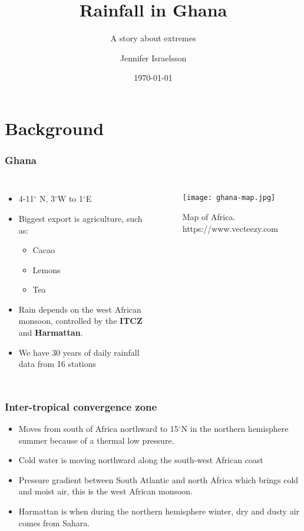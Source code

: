 \documentclass{beamer}
\title{Rainfall in Ghana}
\subtitle{A story about extremes}
\author{Jennifer Israelsson}
\institute{University of Reading}
\date{\today}
\begin{document}
	\begin{frame}
	\titlepage
	\end{frame}

\section{Background}

 \begin{frame}
 \frametitle{Ghana}
 \begin{columns}
 	\column{0.5\textwidth}
 	\begin{itemize}
 		\item 4-11$^{\circ}$ N, 3$^{\circ}$W to 1$^{\circ}$E
 		\item Biggest export is agriculture, such as:
 		\begin{itemize}
 			\item Cacao
 			\item Lemons
 			\item Tea
 	\end{itemize}
 	\item Rain depends on the  west African monsoon, controlled by the \textbf{ITCZ} and \textbf{Harmattan}.
 	\item We have 30 years of daily rainfall data from 16 stations
 	\end{itemize}
 	\column{0.5\textwidth}
 	\begin{figure}
 	\texttt{[image: ghana-map.jpg]}
 	\caption{Map of Africa. https://www.vecteezy.com}
 \end{figure}
 \end{columns}
\end{frame}

\begin{frame}
\frametitle{Inter-tropical convergence zone}
\begin{itemize}
	\item Moves from south of Africa northward to 15$^{\circ}$N in the northern hemisphere summer because of a thermal low pressure.
	\item Cold water is moving northward along the south-west African coast
	\item Pressure gradient between South Atlantic and north Africa which brings cold and moist air, this is the west African monsoon.
	\item Harmattan is when during the northern hemisphere winter, dry and dusty air comes from Sahara.
\end{itemize}
\end{frame}
\end{document}
